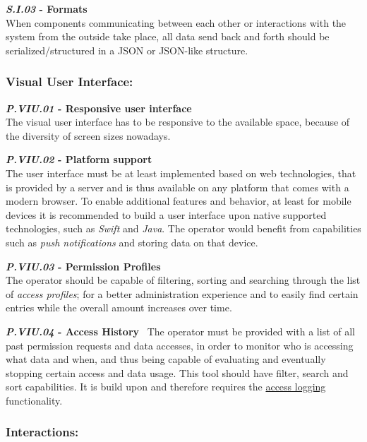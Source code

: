 \documentclass[12pt,english,a4paper,titlepage,cleardoublepage=empty,dottedtoc]{report}
\begin{document}
\textbf{\emph{\protect\hypertarget{si03}{}{S.I.03}} - Formats}\\
When components communicating between each other or interactions with
the system from the outside take place, all data send back and forth
should be serialized/structured in a JSON or JSON-like structure.

\subsubsection{Visual User Interface:}\label{visual-user-interface}

\textbf{\emph{\protect\hypertarget{pviu01}{}{P.VIU.01}} - Responsive
user interface}\\
The visual user interface has to be responsive to the available space,
because of the diversity of screen sizes nowadays.

\textbf{\emph{\protect\hypertarget{pviu02}{}{P.VIU.02}} - Platform
support}\\
The user interface must be at least implemented based on web
technologies, that is provided by a server and is thus available on any
platform that comes with a modern browser. To enable additional features
and behavior, at least for mobile devices it is recommended to build a
user interface upon native supported technologies, such as \emph{Swift}
and \emph{Java}. The operator would benefit from capabilities such as
\emph{push notifications} and storing data on that device.

\textbf{\emph{\protect\hypertarget{pviu03}{}{P.VIU.03}} - Permission
Profiles}\\
The operator should be capable of filtering, sorting and searching
through the list of \emph{access profiles}; for a better administration
experience and to easily find certain entries while the overall amount
increases over time.

\textbf{\emph{\protect\hypertarget{pviu04}{}{P.VIU.04}} - Access
History}~ The operator must be provided with a list of all past
permission requests and data accesses, in order to monitor who is
accessing what data and when, and thus being capable of evaluating and
eventually stopping certain access and data usage. This tool should have
filter, search and sort capabilities. It is build upon and therefore
requires the \protect\hyperlink{pb01}{access logging} functionality.

\subsubsection{Interactions:}\label{interactions}
\end{document}
